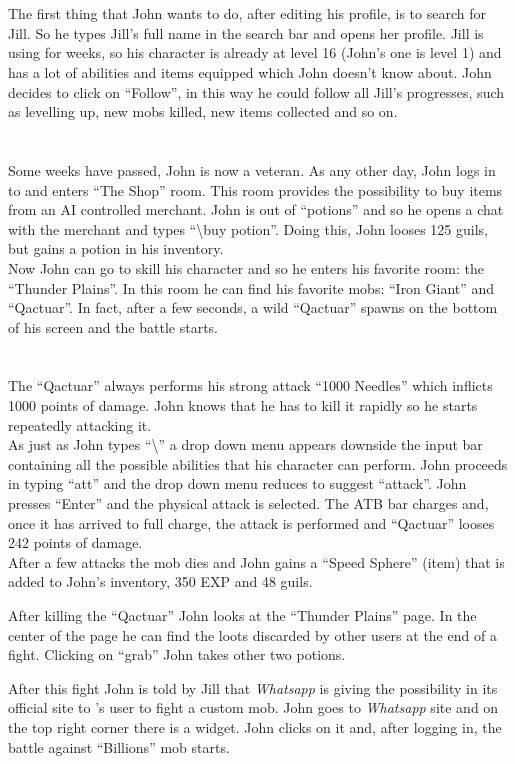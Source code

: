 	\section{\scenarioFellowship}
		The first thing that John wants to do, after editing his profile, is to search for Jill. So he types Jill's full name in the search bar and opens her profile. Jill is using \SocialBattle{} for weeks, so his character is already at level 16 (John's one is level 1) and has a lot of abilities and items equipped which John doesn't know about. John decides to click on ``Follow'', in this way he could follow all Jill's progresses, such as levelling up, new mobs killed, new items collected and so on.

	\section{\scenarioRooms}
		Some weeks have passed, John is now a veteran. As any other day, John logs in to \SocialBattle{} and enters ``The Shop'' room. This room provides the possibility to buy items from an AI controlled merchant. John is out of ``potions'' and so he opens a chat with the merchant and types ``\textbackslash{}buy potion''. Doing this, John looses 125 guils, but gains a potion in his inventory.\\
		Now John can go to skill his character and so he enters his favorite room: the ``Thunder Plains''. In this room he can find his favorite mobs: ``Iron Giant'' and ``Qactuar''. In fact, after a few seconds, a wild ``Qactuar'' spawns on the bottom of his screen and the battle starts.

	\section{\scenarioBattle}
		The ``Qactuar'' always performs his strong attack ``1000 Needles'' which inflicts 1000 points of damage. John knows that he has to kill it rapidly so he starts repeatedly attacking it.\\
		As just as John types ``\textbackslash{}'' a drop down menu appears downside the input bar containing all the possible abilities that his character can perform. John proceeds in typing ``att'' and the drop down menu reduces to suggest ``attack''. John presses ``Enter'' and the physical attack is selected. The ATB bar charges and, once it has arrived to full charge, the attack is performed and ``Qactuar'' looses 242 points of damage.\\
		After a few attacks the mob dies and John gains a ``Speed Sphere'' (item) that is added to John's inventory, 350 EXP and 48 guils.

		After killing the ``Qactuar'' John looks at the ``Thunder Plains'' page. In the center of the page he can find the loots discarded by other users at the end of a fight. Clicking on ``grab'' John takes other two potions.

		After this fight John is told by Jill that \textit{Whatsapp} is giving the possibility in its official site to \SocialBattle{}'s user to fight a custom mob. John goes to \textit{Whatsapp} site and on the top right corner there is a widget. John clicks on it and, after logging in, the battle against ``Billions'' mob starts.
	